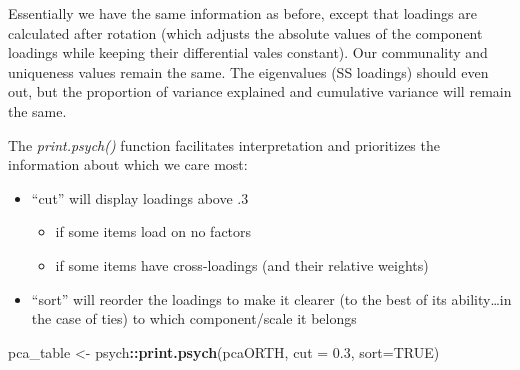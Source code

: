 \documentclass[
  english,
]{book}
\newenvironment{Shaded}{\begin{snugshade}}{\end{snugshade}}
\newcommand{\DataTypeTok}[1]{\textcolor[rgb]{0.13,0.29,0.53}{#1}}
\newcommand{\FloatTok}[1]{\textcolor[rgb]{0.00,0.00,0.81}{#1}}
\newcommand{\KeywordTok}[1]{\textcolor[rgb]{0.13,0.29,0.53}{\textbf{#1}}}
\newcommand{\NormalTok}[1]{#1}
\newcommand{\OperatorTok}[1]{\textcolor[rgb]{0.81,0.36,0.00}{\textbf{#1}}}
\newcommand{\OtherTok}[1]{\textcolor[rgb]{0.56,0.35,0.01}{#1}}
\newcommand{\StringTok}[1]{\textcolor[rgb]{0.31,0.60,0.02}{#1}}
\providecommand{\tightlist}{%
  \setlength{\itemsep}{0pt}\setlength{\parskip}{0pt}}
\begin{document}
Essentially we have the same information as before, except that loadings are calculated after rotation (which adjusts the absolute values of the component loadings while keeping their differential vales constant). Our communality and uniqueness values remain the same. The eigenvalues (SS loadings) should even out, but the proportion of variance explained and cumulative variance will remain the same.

The \emph{print.psych()} function facilitates interpretation and prioritizes the information about which we care most:

\begin{itemize}
\tightlist
\item
  ``cut'' will display loadings above .3

  \begin{itemize}
  \tightlist
  \item
    if some items load on no factors
  \item
    if some items have cross-loadings (and their relative weights)
  \end{itemize}
\item
  ``sort'' will reorder the loadings to make it clearer (to the best of its ability\ldots in the case of ties) to which component/scale it belongs
\end{itemize}

\begin{Shaded}
\begin{Highlighting}[]
\NormalTok{pca_table <-}\StringTok{ }\NormalTok{psych}\OperatorTok{::}\KeywordTok{print.psych}\NormalTok{(pcaORTH, }\DataTypeTok{cut =} \FloatTok{0.3}\NormalTok{, }\DataTypeTok{sort=}\OtherTok{TRUE}\NormalTok{)}
\end{Highlighting}
\end{Shaded}
\end{document}
